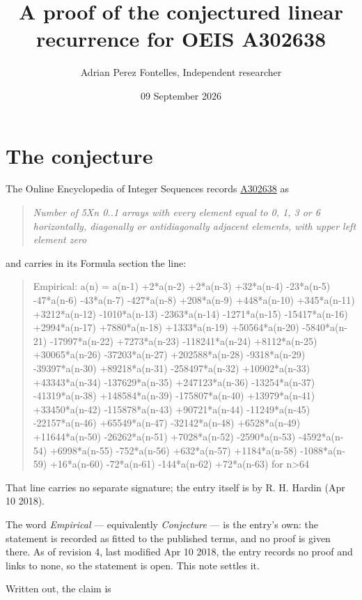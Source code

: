 \documentclass[11pt]{article}
\title{A proof of the conjectured linear recurrence for OEIS A302638}
\author{Adrian Perez Fontelles, Independent researcher}
\date{09 September 2026}
\theoremstyle{definition}
\begin{document}
\maketitle
\section{The conjecture}

The Online Encyclopedia of Integer Sequences records \href{https://oeis.org/A302638}{A302638} as

\begin{quote}\itshape Number of 5Xn 0..1 arrays with every element equal to 0, 1, 3 or 6 horizontally, diagonally or antidiagonally adjacent elements, with upper left element zero\end{quote}

and carries in its Formula section the line:

\begin{quote}\ttfamily Empirical: a(n) = a(n-1) +2*a(n-2) +2*a(n-3) +32*a(n-4) -23*a(n-5) -47*a(n-6) -43*a(n-7) -427*a(n-8) +208*a(n-9) +448*a(n-10) +345*a(n-11) +3212*a(n-12) -1010*a(n-13) -2363*a(n-14) -1271*a(n-15) -15417*a(n-16) +2994*a(n-17) +7880*a(n-18) +1333*a(n-19) +50564*a(n-20) -5840*a(n-21) -17997*a(n-22) +7273*a(n-23) -118241*a(n-24) +8112*a(n-25) +30065*a(n-26) -37203*a(n-27) +202588*a(n-28) -9318*a(n-29) -39397*a(n-30) +89218*a(n-31) -258497*a(n-32) +10902*a(n-33) +43343*a(n-34) -137629*a(n-35) +247123*a(n-36) -13254*a(n-37) -41319*a(n-38) +148584*a(n-39) -175807*a(n-40) +13979*a(n-41) +33450*a(n-42) -115878*a(n-43) +90721*a(n-44) -11249*a(n-45) -22157*a(n-46) +65549*a(n-47) -32142*a(n-48) +6528*a(n-49) +11644*a(n-50) -26262*a(n-51) +7028*a(n-52) -2590*a(n-53) -4592*a(n-54) +6998*a(n-55) -752*a(n-56) +632*a(n-57) +1184*a(n-58) -1088*a(n-59) +16*a(n-60) -72*a(n-61) -144*a(n-62) +72*a(n-63) for n>64\end{quote}

That line carries no separate signature; the entry itself is by R. H. Hardin (Apr 10 2018).

The word {\itshape Empirical} --- equivalently {\itshape Conjecture} --- is the entry's own: the statement is recorded as fitted to the published terms, and no proof is given there. As of revision 4, last modified Apr 10 2018, the entry records no proof and links to none, so the statement is open. This note settles it.

Written out, the claim is
\end{document}
